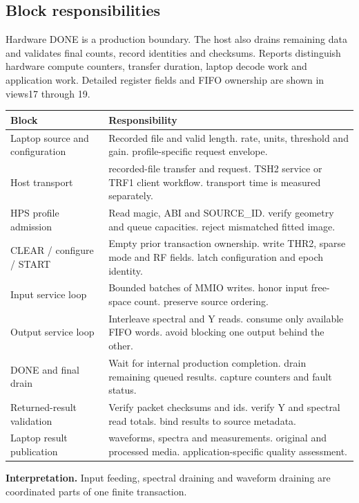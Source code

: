 \documentclass[11pt,letterpaper]{article}
\begin{document}
\subsection*{Block responsibilities}
Hardware DONE is a production boundary. The host also drains remaining data and validates final counts, record identities and checksums. Reports distinguish hardware compute counters, transfer duration, laptop decode work and application work. Detailed register fields and FIFO ownership are shown in views17 through 19.
\par\medskip\noindent
\begin{tabularx}{\linewidth}{@{}>{\raggedright\arraybackslash}p{1.65in}Y@{}}\toprule
\textbf{Block} & \textbf{Responsibility} \\ \midrule
Laptop source and configuration & Recorded file and valid length. rate, units, threshold and gain. profile-specific request envelope. \\[5pt]
Host transport & recorded-file transfer and request. TSH2 service or TRF1 client workflow. transport time is measured separately. \\[5pt]
HPS profile admission & Read magic, ABI and SOURCE\_ID. verify geometry and queue capacities. reject mismatched fitted image. \\[5pt]
CLEAR / configure / START & Empty prior transaction ownership. write THR2, sparse mode and RF fields. latch configuration and epoch identity. \\[5pt]
Input service loop & Bounded batches of MMIO writes. honor input free-space count. preserve source ordering. \\[5pt]
Output service loop & Interleave spectral and Y reads. consume only available FIFO words. avoid blocking one output behind the other. \\[5pt]
DONE and final drain & Wait for internal production completion. drain remaining queued results. capture counters and fault status. \\[5pt]
Returned-result validation & Verify packet checksums and ids. verify Y and spectral read totals. bind results to source metadata. \\[5pt]
Laptop result publication & waveforms, spectra and measurements. original and processed media. application-specific quality assessment. \\[5pt]
\bottomrule\end{tabularx}
\vspace{8pt}
\noindent\textbf{Interpretation.} Input feeding, spectral draining and waveform draining are coordinated parts of one finite transaction.
\clearpage
\end{document}
